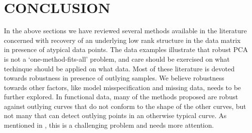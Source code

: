\section*{\sffamily \Large CONCLUSION}

In the above sections we have reviewed several methods available in the literature concerned with recovery of an underlying low rank structure in the data matrix in presence of atypical data points. The data examples illustrate that robust PCA is not a `one-method-fits-all' problem, and care should be exercised on what techinque should be applied on what data. Most of these literature is devoted towards robustness in presence of outlying samples. We believe robustness towards other factors, like model misspecification and missing data, needs to be further explored. In functional data, many of the methods proposed are robust against outlying curves that do not conform to the shape of the other curves, but not many that can detect outlying points in an otherwise typical curve. As mentioned in \cite{BaliBoenteReview}, this is a challenging problem and needs more attention.